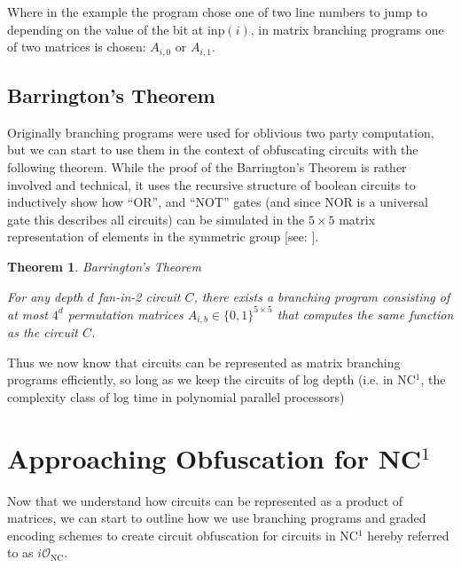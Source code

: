 \documentclass[12pt,twoside]{reedthesis}
\newtheorem{theorem}{Theorem}
\begin{document}
     \par Where in the example the program chose one of two line numbers to jump to depending on the value of the bit at inp$(i)$, in matrix branching programs one of two matrices is chosen: $A_{i,0}$ or $A_{i,1}$.
         
      
       
            
      \subsection{Barrington's Theorem}
      
       Originally branching programs were used for oblivious two party computation, but we can start to use them in the context of obfuscating circuits with the following theorem. While the proof of the Barrington's Theorem is rather involved and technical, it uses the recursive structure of boolean circuits to inductively show how ``OR'', and ``NOT'' gates (and since NOR is a universal gate this describes all circuits) can be simulated in the $5 \times 5$ matrix representation of elements in the symmetric group [see: \cite{Barrington:1986:BPB:12130.12131}].
      
      
      \begin{theorem}{Barrington's Theorem}
      \par For any depth $d$ fan-in-2 circuit $C$, there exists a branching program consisting of at most $4^d$ permutation matrices $A_{i,b}\in\{0,1\}^{5 \times 5}$ that computes the same function as the circuit $C$.
      \end{theorem}
      
      
    \par Thus we now know that circuits can be represented as matrix branching programs efficiently, so long as we keep the circuits of log depth (i.e. in NC$^1$, the complexity class of log time in polynomial parallel processors)
     
     \section{Approaching Obfuscation for NC$^1$}
     \newcommand{\inp}[0]{\text{inp}}
     
     Now that we understand how circuits can be represented as a product of matrices, we can start to outline how we use branching programs and graded encoding schemes to create circuit obfuscation for circuits in NC$^1$ hereby referred to as $i\mathcal{O}_\text{NC}$.
     
\end{document}
